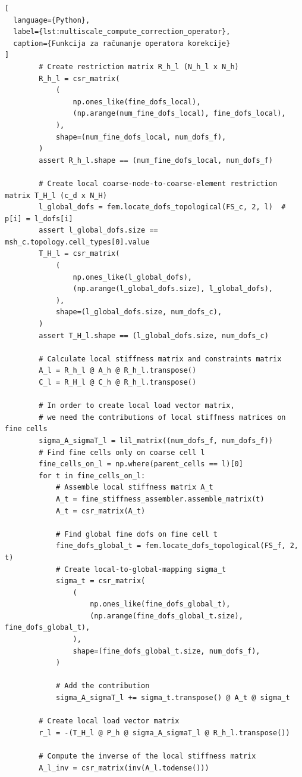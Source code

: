 \documentclass[zavrsnirad]{fer}
\begin{document}
\begin{lstlisting}[
  language={Python},
  label={lst:multiscale_compute_correction_operator},
  caption={Funkcija za računanje operatora korekcije}
]
        # Create restriction matrix R_h_l (N_h_l x N_h)
        R_h_l = csr_matrix(
            (
                np.ones_like(fine_dofs_local),
                (np.arange(num_fine_dofs_local), fine_dofs_local),
            ),
            shape=(num_fine_dofs_local, num_dofs_f),
        )
        assert R_h_l.shape == (num_fine_dofs_local, num_dofs_f)

        # Create local coarse-node-to-coarse-element restriction matrix T_H_l (c_d x N_H)
        l_global_dofs = fem.locate_dofs_topological(FS_c, 2, l)  # p[i] = l_dofs[i]
        assert l_global_dofs.size == msh_c.topology.cell_types[0].value
        T_H_l = csr_matrix(
            (
                np.ones_like(l_global_dofs),
                (np.arange(l_global_dofs.size), l_global_dofs),
            ),
            shape=(l_global_dofs.size, num_dofs_c),
        )
        assert T_H_l.shape == (l_global_dofs.size, num_dofs_c)

        # Calculate local stiffness matrix and constraints matrix
        A_l = R_h_l @ A_h @ R_h_l.transpose()
        C_l = R_H_l @ C_h @ R_h_l.transpose()

        # In order to create local load vector matrix,
        # we need the contributions of local stiffness matrices on fine cells
        sigma_A_sigmaT_l = lil_matrix((num_dofs_f, num_dofs_f))
        # Find fine cells only on coarse cell l
        fine_cells_on_l = np.where(parent_cells == l)[0]
        for t in fine_cells_on_l:
            # Assemble local stiffness matrix A_t
            A_t = fine_stiffness_assembler.assemble_matrix(t)
            A_t = csr_matrix(A_t)

            # Find global fine dofs on fine cell t
            fine_dofs_global_t = fem.locate_dofs_topological(FS_f, 2, t)
            # Create local-to-global-mapping sigma_t
            sigma_t = csr_matrix(
                (
                    np.ones_like(fine_dofs_global_t),
                    (np.arange(fine_dofs_global_t.size), fine_dofs_global_t),
                ),
                shape=(fine_dofs_global_t.size, num_dofs_f),
            )

            # Add the contribution
            sigma_A_sigmaT_l += sigma_t.transpose() @ A_t @ sigma_t

        # Create local load vector matrix
        r_l = -(T_H_l @ P_h @ sigma_A_sigmaT_l @ R_h_l.transpose())

        # Compute the inverse of the local stiffness matrix
        A_l_inv = csr_matrix(inv(A_l.todense()))


\end{lstlisting}
\end{document}
